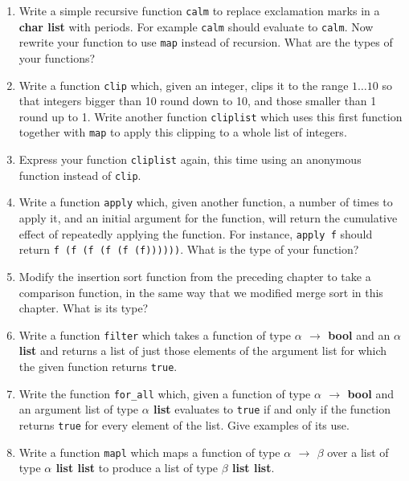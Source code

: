 \documentclass[]{book}
\newcommand\upquote[1]{\textquotesingle#1\textquotesingle}
\begin{document}
\begin{enumerate}
  \item Write a simple recursive function \texttt{calm} to replace exclamation marks in a \textbf{\textrm{char list}} with periods. For example \texttt{calm\! [\upquote{H};\! \upquote{e};\! \upquote{l};\! \upquote{p};\! \upquote{!};\! \upquote{ };\! \upquote{F};\! \upquote{i};\! \upquote{r};\! \upquote{e};\! \upquote{!}]} should evaluate to \texttt{calm\! [\upquote{H};\! \upquote{e};\! \upquote{l};\! \upquote{p};\! \upquote{.};\! \upquote{ };\! \upquote{F};\! \upquote{i};\! \upquote{r};\! \upquote{e};\! \upquote{.}]}. Now rewrite your function to use \texttt{map} instead of recursion. What are the types of your functions?
  \item Write a function \texttt{clip} which, given an integer, clips it to the range $1\ldots 10$ so that integers bigger than 10 round down to 10, and those smaller than 1 round up to 1. Write another function \texttt{cliplist} which uses this first function together with \texttt{map} to apply this clipping to a whole list of integers.
  \item Express your function \texttt{cliplist} again, this time using an anonymous function instead of \texttt{clip}.
  \item Write a function \texttt{apply} which, given another function, a number of times to apply it, and an initial argument for the function, will return the cumulative effect of repeatedly applying the function. For instance, \texttt{apply\! f} should return \texttt{f\! (f\! (f\! (f\! (f\! (f))))))}. What is the type of your function?
  \item Modify the insertion sort function from the preceding chapter to take a comparison function, in the same way that we modified merge sort in this chapter. What is its type?
  \item Write a function \texttt{filter} which takes a function of type \textbf{\textrm{$\alpha$ $\rightarrow$ bool}} and an \textrm{\textbf{$\alpha$ list}} and returns a list of just those elements of the argument list for which the given function returns \texttt{true}.
  \item Write the function \texttt{for\_all} which, given a function of type \textbf{\textrm{$\alpha$ $\rightarrow$ bool}} and an argument list of type \textrm{\textbf{$\alpha$ list}} evaluates to \texttt{true} if and only if the function returns \texttt{true} for every element of the list. Give examples of its use.
  \item Write a function \texttt{mapl} which maps a function of type \textbf{\textrm{$\alpha$ $\rightarrow$ $\beta$}} over a list of type \textbf{\textrm{$\alpha$ list list}} to produce a list of type \textbf{\textrm{$\beta$ list list}}.
\end{enumerate}
\end{document}
